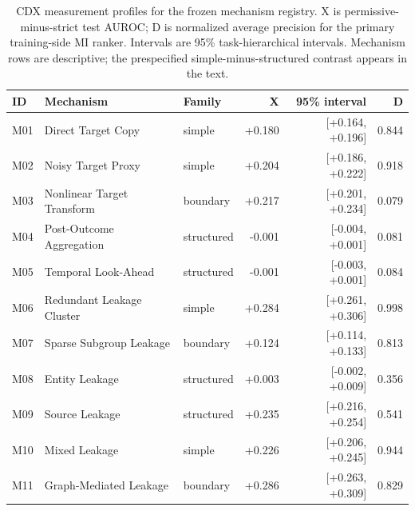 \begin{table}[t]
\caption{CDX measurement profiles for the frozen mechanism registry. X is permissive-minus-strict test AUROC; D is normalized average precision for the primary training-side MI ranker. Intervals are 95\% task-hierarchical intervals. Mechanism rows are descriptive; the prespecified simple-minus-structured contrast appears in the text.}
\label{tab:measurement}
\centering\small
\begin{tabular}{lllrrr}
\toprule
ID & Mechanism & Family & X & 95\% interval & D \\
\midrule
M01 & Direct Target Copy & simple & +0.180 & [+0.164, +0.196] & 0.844 \\
M02 & Noisy Target Proxy & simple & +0.204 & [+0.186, +0.222] & 0.918 \\
M03 & Nonlinear Target Transform & boundary & +0.217 & [+0.201, +0.234] & 0.079 \\
M04 & Post-Outcome Aggregation & structured & -0.001 & [-0.004, +0.001] & 0.081 \\
M05 & Temporal Look-Ahead & structured & -0.001 & [-0.003, +0.001] & 0.084 \\
M06 & Redundant Leakage Cluster & simple & +0.284 & [+0.261, +0.306] & 0.998 \\
M07 & Sparse Subgroup Leakage & boundary & +0.124 & [+0.114, +0.133] & 0.813 \\
M08 & Entity Leakage & structured & +0.003 & [-0.002, +0.009] & 0.356 \\
M09 & Source Leakage & structured & +0.235 & [+0.216, +0.254] & 0.541 \\
M10 & Mixed Leakage & simple & +0.226 & [+0.206, +0.245] & 0.944 \\
M11 & Graph-Mediated Leakage & boundary & +0.286 & [+0.263, +0.309] & 0.829 \\
\bottomrule
\end{tabular}
\end{table}
